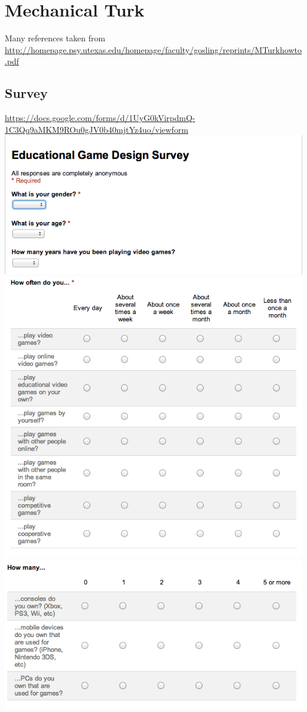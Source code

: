 \section{Mechanical Turk}
	Many references taken from \url{http://homepage.psy.utexas.edu/homepage/faculty/gosling/reprints/MTurkhowto.pdf}
	\subsection{Survey}
		\url{https://docs.google.com/forms/d/1UyG0kVirpdmQ-1C3Qq9aMKM9ROu0gJV0b40mjtYz4uo/viewform} \\
		\includegraphics[width = \textwidth]{img/survey1.png}
		\includegraphics[width = \textwidth]{img/survey2.png}
		\includegraphics[width = \textwidth]{img/survey3.png}
